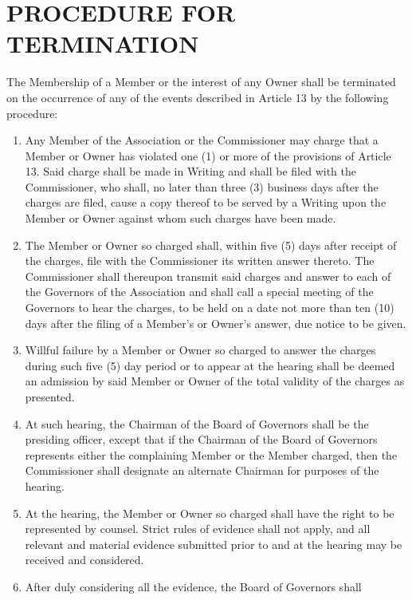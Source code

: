 \documentclass[]{book}
\providecommand{\tightlist}{%
  \setlength{\itemsep}{0pt}\setlength{\parskip}{0pt}}
\theoremstyle{definition}
\theoremstyle{definition}
\theoremstyle{definition}
\theoremstyle{remark}
\begin{document}
\section{PROCEDURE FOR TERMINATION}\label{procedure-for-termination}

The Membership of a Member or the interest of any Owner shall be
terminated on the occurrence of any of the events described in Article
13 by the following procedure:

\begin{enumerate}
\def\labelenumi{(\alph{enumi})}
\tightlist
\item
  Any Member of the Association or the Commissioner may charge that a
  Member or Owner has violated one (1) or more of the provisions of
  Article 13. Said charge shall be made in Writing and shall be filed
  with the Commissioner, who shall, no later than three (3) business
  days after the charges are filed, cause a copy thereof to be served by
  a Writing upon the Member or Owner against whom such charges have been
  made.
\item
  The Member or Owner so charged shall, within five (5) days after
  receipt of the charges, file with the Commissioner its written answer
  thereto. The Commissioner shall thereupon transmit said charges and
  answer to each of the Governors of the Association and shall call a
  special meeting of the Governors to hear the charges, to be held on a
  date not more than ten (10) days after the filing of a Member's or
  Owner's answer, due notice to be given.
\item
  Willful failure by a Member or Owner so charged to answer the charges
  during such five (5) day period or to appear at the hearing shall be
  deemed an admission by said Member or Owner of the total validity of
  the charges as presented.
\item
  At such hearing, the Chairman of the Board of Governors shall be the
  presiding officer, except that if the Chairman of the Board of
  Governors represents either the complaining Member or the Member
  charged, then the Commissioner shall designate an alternate Chairman
  for purposes of the hearing.
\item
  At the hearing, the Member or Owner so charged shall have the right to
  be represented by counsel. Strict rules of evidence shall not apply,
  and all relevant and material evidence submitted prior to and at the
  hearing may be received and considered.
\item
  After duly considering all the evidence, the Board of Governors shall

\end{enumerate}
\end{document}
